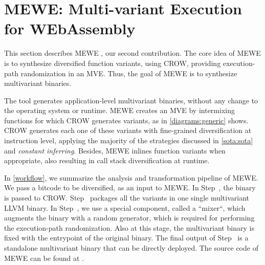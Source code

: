\section{MEWE: Multi-variant Execution for WEbAssembly}
\label{section:mewe}

\newcommand{\tool}{MEWE\xspace}
\newcommand{\repourl}{TODO}
This section describes MEWE \cite{MEWE}, our second contribution. 
The core idea of \tool is to synthesize diversified function variants, using CROW, providing execution-path randomization in an MVE. Thus, the goal of \tool is to synthesize multivariant  \wasm binaries. %

The tool generates application-level multivariant binaries, without any change to the operating system or \wasm runtime.
MEWE creates an MVE by intermixing functions for which CROW generates variants, as  in \autoref{diagrams:generic} shows.
CROW generates each one of these variants with fine-grained diversification at instruction level, applying the majority of the strategies discussed in \autoref{sota:sota} and \emph{constant inferring}. Besides, \tool inlines function variants when appropriate, also resulting in call stack diversification at runtime.

In \autoref{workflow}, we summarize the analysis and transformation pipeline of \tool.
We pass a bitcode to be diversified, as an input to \tool.
In Step~, the binary is passed to CROW. 
Step~ packages all the variants in one single multivariant LLVM binary. 
In Step~, we use a special component, called a ``mixer``,  which augments the binary with a random generator, which is required for performing the execution-path randomization. 
Also at this stage, the multivariant binary is fixed with the entrypoint of the original binary.
The final output of Step~ is a standalone multivariant \wasm binary that can be directly deployed. 
The source code of MEWE can be found at \todo{}.

